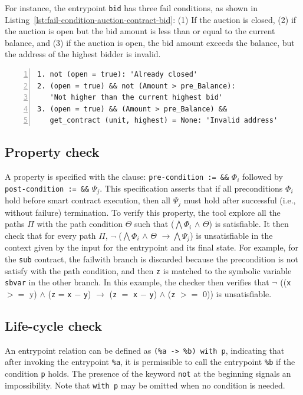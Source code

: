 \documentclass[runningheads]{llncs}
\begin{document}
For instance, the entrypoint \lstinline|bid| has three fail conditions, as shown in Listing~\ref{lst:fail-condition-auction-contract-bid}: (1) If the auction is closed, (2) if the auction is open but the bid amount is less than or equal to the current balance, and (3) if the auction is open, the bid amount exceeds the balance, but the address of the highest bidder is invalid.
\begin{lstlisting}[float=tp,captionpos=b,caption={Fail condition for auction contract bid entrypoint},label={lst:fail-condition-auction-contract-bid},numbers=left]
1. not (open = true): 'Already closed'
2. (open = true) && not (Amount > pre_Balance):
   'Not higher than the current highest bid'
3. (open = true) && (Amount > pre_Balance) && 
   get_contract (unit, highest) = None: 'Invalid address' 
\end{lstlisting}
\subsection{Property check}
\label{sec:property-check}
A property is
specified with the clause:  \lstinline/pre-condition := &&/
$\Phi_{i}$ followed by \lstinline/post-condition := &&/ $\Psi_{j}$. This
specification asserts that if all preconditions $\Phi_{i}$ hold before
smart contract execution, then all $\Psi_{j}$ must hold after
successful (i.e., without failure) termination. To verify this
property, the tool explore all the paths $\Pi$ 
with the path condition $\Theta$ such that ($\bigwedge \Phi_{i}$
$\land$ $\Theta$) is satisfiable. It then check that for every path
$\Pi$, $\neg$ ($\bigwedge \Phi_{i}$ $\land$ $\Theta$ $\rightarrow \bigwedge \Psi_{j}$) is unsatisfiable in the context given by the input for the entrypoint
and its final state. For example, for the \lstinline/sub/ contract, the failwith branch is discarded because the precondition is not satisfy with the path condition, and then \lstinline/z/ is matched to
the symbolic variable \lstinline/sbvar/ in the other branch. In this
example, the checker then verifies that $\neg$ ((\lstinline/x/ $>=$ y) $\land$ (\lstinline/z/
= \lstinline/x/ $-$ \lstinline/y/) $\rightarrow$ (\lstinline/z/ $=$ \lstinline/x/ $-$ \lstinline/y/) $\land$ (\lstinline/z/ $>=$ 0)) is unsatisfiable.
\subsection{Life-cycle check}
\label{sec:life-cycle-check}
An entrypoint relation can be defined as \lstinline/(%a -> %b) with p/, indicating that after invoking the entrypoint \lstinline/%a/, it is permissible to call the entrypoint \lstinline/%b/ if the condition \lstinline/p/ holds. The presence of the keyword \lstinline/not/ at the beginning signals an impossibility. Note that \lstinline/with p/ may be omitted when no condition is needed.
\end{document}
